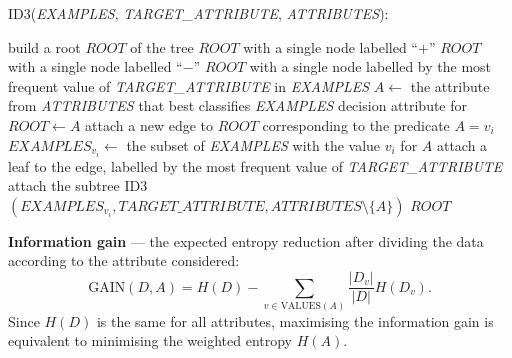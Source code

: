 \documentclass[11pt,a4paper]{article}
\theoremstyle{definition}
\providecommand{\uv}[1]{``#1''}
\begin{document}
\begin{defbox}
\textsc{ID3}(\emph{EXAMPLES}, \emph{TARGET\_ATTRIBUTE}, \emph{ATTRIBUTES}):
\begin{algorithmic}[1]
\State build a root $\mathit{ROOT}$ of the tree
 \Return $\mathit{ROOT}$ with a single node labelled
  \uv{$+$} \EndIf
{} \Return $\mathit{ROOT}$ with a single node labelled
  \uv{$-$} \EndIf
{} \Return $\mathit{ROOT}$ with a single node labelled by the
  most frequent value of \emph{TARGET\_ATTRIBUTE} in \emph{EXAMPLES} \EndIf
\State $A\gets$ the attribute from \emph{ATTRIBUTES} that best classifies \emph{EXAMPLES}
\State decision attribute for $\mathit{ROOT}\gets A$
   \State attach a new edge to $\mathit{ROOT}$ corresponding to the predicate $A=v_i$
   \State $\mathit{EXAMPLES}_{v_i}\gets$ the subset of \emph{EXAMPLES} with the value $v_i$ for
          $A$
      \State attach a leaf to the edge, labelled by the most frequent value of
             \emph{TARGET\_ATTRIBUTE}
   \Else
      \State attach the subtree \textsc{ID3}$(\mathit{EXAMPLES}_{v_i},
             \mathit{TARGET\_ATTRIBUTE}, \mathit{ATTRIBUTES}\setminus\{A\})$
   \EndIf
\EndFor
\State \Return $\mathit{ROOT}$
\end{algorithmic}

\textbf{Information gain} --- the expected entropy reduction after dividing the data according to
the attribute considered:
\[ \mathrm{GAIN}(D,A)=H(D)-\sum_{v\in \mathrm{VALUES}(A)}\frac{|D_v|}{|D|}H(D_v). \]
Since $H(D)$ is the same for all attributes, maximising the information gain is equivalent to
minimising the weighted entropy $H(A)$.
\end{defbox}
\end{document}
